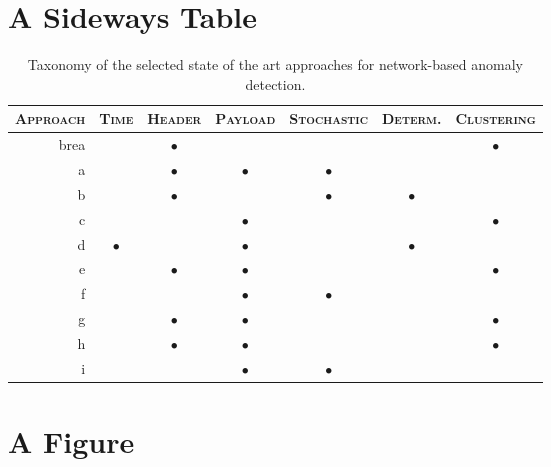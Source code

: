 
\section{A Sideways Table}

\clearpage
\begin{table}
\renewcommand{\arraystretch}{1.5} \centering
\begin{tabular}{rcccccc}
\toprule \textsc{Approach} & \textsc{Time} & \textsc{Header} &
\textsc{Payload} & \textsc{Stochastic} & \textsc{Determ.} & \textsc{Clustering}\\
\midrule brea & & $\bullet$ & & & & $\bullet$ \\
a & & $\bullet$ & $\bullet$ & $\bullet$ & & \\
b & & $\bullet$ & & $\bullet$ & $\bullet$ & \\
c & & & $\bullet$ & & & $\bullet$ \\
d & $\bullet$ & & $\bullet$ & & $\bullet$ & \\
e & & $\bullet$ & $\bullet$ & & & $\bullet$ \\
f & & & $\bullet$ & $\bullet$ & & \\
g & & $\bullet$ & $\bullet$ & & & $\bullet$ \\
h & & $\bullet$ & $\bullet$ & & & $\bullet$ \\
i & & & $\bullet$ & $\bullet$ & & \\
\bottomrule
\end{tabular}
\caption{Taxonomy of the selected state of the art approaches for network-based anomaly detection.}
\label{tab:network-sota-taxonomy}
\end{table}
\clearpage


\section{A Figure}

